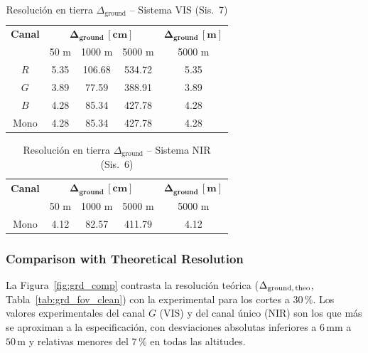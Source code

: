     \begin{table}[H]
        \centering
        \caption{Resolución en tierra \(\Delta_{\text{ground}}\) – Sistema VIS (Sis.~7)}
        \label{tab:grd_vis_corrected}
        \begin{tabular}{|c|c|c|c|c|}
            \hline
            \rowcolor[HTML]{EFEFEF}
            \textbf{Canal} &
            \multicolumn{3}{c|}{\(\mathbf{\Delta_{\text{ground}}\,[\text{cm}]}\)} &
            \(\mathbf{\Delta_{\text{ground}}\,[\text{m}]}\) \\ \cline{2-4}
            \rowcolor[HTML]{EFEFEF}
            & 50 m & 1000 m & 5000 m & 5000 m \\ \hline
            \(R\)   & 5.35 & 106.68 & 534.72 & 5.35 \\ \hline
            \(G\)   & 3.89 &  77.59 & 388.91 & 3.89 \\ \hline
            \(B\)   & 4.28 &  85.34 & 427.78 & 4.28 \\ \hline
            Mono    & 4.28 &  85.34 & 427.78 & 4.28 \\ \hline
        \end{tabular}
    \end{table}

    \begin{table}[H]
        \centering
        \caption{Resolución en tierra \(\Delta_{\text{ground}}\) – Sistema NIR (Sis.~6)}
        \label{tab:grd_nir_corrected}
        \begin{tabular}{|c|c|c|c|c|}
            \hline
            \rowcolor[HTML]{EFEFEF}
            \textbf{Canal} &
            \multicolumn{3}{c|}{\(\mathbf{\Delta_{\text{ground}}\,[\text{cm}]}\)} &
            \(\mathbf{\Delta_{\text{ground}}\,[\text{m}]}\) \\ \cline{2-4}
            \rowcolor[HTML]{EFEFEF}
            & 50 m & 1000 m & 5000 m & 5000 m \\ \hline
            Mono  & 4.12 & 82.57 & 411.79 & 4.12 \\ \hline
        \end{tabular}
    \end{table}

    \subsubsection{Comparison with Theoretical Resolution}
    \label{subsub:grd_comp}
    La Figura~\ref{fig:grd_comp} contrasta la resolución teórica
    (\(\Delta_{\text{ground,\,theo}}\), Tabla~\ref{tab:grd_fov_clean})
    con la experimental para los cortes a \(30\,\%\).
    Los valores experimentales del canal \(G\) (VIS) y del canal único (NIR) son los
    que más se aproximan a la especificación, con desviaciones absolutas
    inferiores a \(6\,\mathrm{mm}\) a \(50\,\mathrm{m}\)
    y relativas menores del \(7\,\%\) en todas las altitudes.


